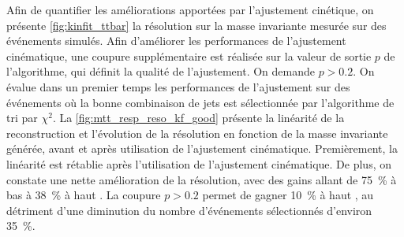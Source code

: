 
Afin de quantifier les améliorations apportées par l'ajustement cinétique, on présente \cref{fig:kinfit_ttbar} la résolution sur la masse invariante mesurée sur des événements \ttbar simulés. Afin d'améliorer les performances de l'ajustement cinématique, une coupure supplémentaire est réalisée sur la valeur de sortie $p$ de l'algorithme, qui définit la qualité de l'ajustement. On demande $p > \num{0.2}$. On évalue dans un premier temps les performances de l'ajustement sur des événements où la bonne combinaison de jets est sélectionnée par l'algorithme de tri par $\chi^2$. La \cref{fig:mtt_resp_reso_kf_good} présente la linéarité de la reconstruction et l'évolution de la résolution en fonction de la masse invariante \ttbar générée, avant et après utilisation de l'ajustement cinématique. Premièrement, la linéarité est rétablie après l'utilisation de l'ajustement cinématique. De plus, on constate une nette amélioration de la résolution, avec des gains allant de \tilde\SI{75}{\%} à bas \mtt à \tilde\SI{38}{\%} à haut \mtt. La coupure $p > \num{0.2}$ permet de gagner \tilde\SI{10}{\%} à haut \mtt, au détriment d'une diminution du nombre d'événements sélectionnés d'environ \SI{35}{\%}.

